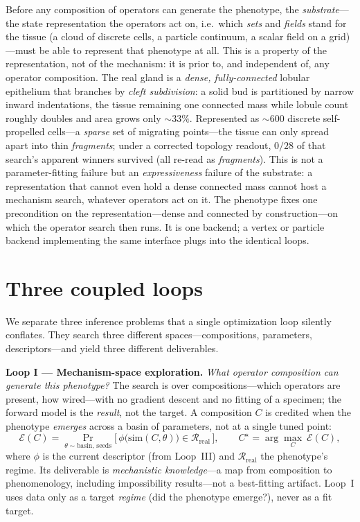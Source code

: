 \documentclass[11pt]{article}
\begin{document}
Before any composition of operators can generate the phenotype, the \emph{substrate}---the state representation the operators act on, i.e.\ which \emph{sets} and \emph{fields} stand for the tissue (a cloud of discrete cells, a particle continuum, a scalar field on a grid)---must be able to represent that phenotype at all. This is a property of the representation, not of the mechanism: it is prior to, and independent of, any operator composition. The real gland is a \emph{dense, fully-connected} lobular epithelium that branches by \emph{cleft subdivision}: a solid bud is partitioned by narrow inward indentations, the tissue remaining one connected mass while lobule count roughly doubles and area grows only $\sim\!33\%$. Represented as $\sim\!600$ discrete self-propelled cells---a \emph{sparse} set of migrating points---the tissue can only spread apart into thin \emph{fragments}; under a corrected topology readout, $0/28$ of that search's apparent winners survived (all re-read as \emph{fragments}). This is not a parameter-fitting failure but an \emph{expressiveness} failure of the substrate: a representation that cannot even hold a dense connected mass cannot host a mechanism search, whatever operators act on it. The phenotype fixes one precondition on the representation---dense and connected by construction---on which the operator search then runs. It is one backend; a vertex or particle backend implementing the same interface plugs into the identical loops.

\section*{Three coupled loops}

We separate three inference problems that a single optimization loop silently conflates. They search three different spaces---compositions, parameters, descriptors---and yield three different deliverables.

\textbf{Loop I --- Mechanism-space exploration.} \emph{What operator composition can generate this phenotype?} The search is over compositions---which operators are present, how wired---with no gradient descent and no fitting of a specimen; the forward model is the \emph{result}, not the target. A composition $C$ is credited when the phenotype \emph{emerges} across a basin of parameters, not at a single tuned point:
\[
\mathcal{E}(C)=\Pr_{\theta\sim\text{basin},\,\text{seeds}}\!\Big[\,\phi\big(\mathrm{sim}(C,\theta)\big)\in\mathcal{R}_{\text{real}}\,\Big],
\qquad C^\star=\arg\max_{C}\ \mathcal{E}(C),
\]
where $\phi$ is the current descriptor (from Loop~III) and $\mathcal{R}_{\text{real}}$ the phenotype's regime. Its deliverable is \emph{mechanistic knowledge}---a map from composition to phenomenology, including impossibility results---not a best-fitting artifact. Loop~I uses data only as a target \emph{regime} (did the phenotype emerge?), never as a fit target.
\end{document}
